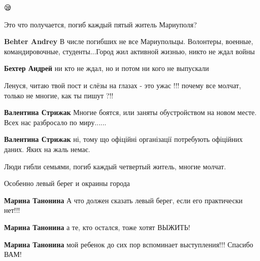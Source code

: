  
 
 
 
 

\qqSecCmt

😪


Это что получается, погиб каждый пятый житель Мариуполя?

\begin{itemize} %
\textbf{Behter Andrey} В числе погибших не все Мариупольцы. Волонтеры, военные, командировочные, студенты...Город жил активной жизнью, никто не ждал войны

\textbf{Бехтер Андрей} ни кто не ждал, но и потом ни кого не выпускали

\end{itemize} %


Ленуся, читаю твой пост и слёзы на глазах - это ужас !!! почему все молчат,
только не многие, как ты пишут ?!!

\begin{itemize} %
\textbf{Валентина Стрижак} Многие боятся, или заняты обустройством на новом месте. Всех нас разбросало по миру......

\textbf{Валентина Стрижак} ні, тому що офіційні організації потребують офіційних даних. Яких на жаль немає.
\end{itemize} %


Люди гибли семьями, погиб каждый четвертый житель, многие молчат.

Особенно левый берег и окраины города

\begin{itemize} %
\textbf{Марина Танонина} А что должен сказать левый берег, если его практически нет!!!

\textbf{Марина Танонина} а те, кто остался, тоже хотят ВЫЖИТЬ!

\textbf{Марина Танонина} мой ребенок до сих пор вспоминает выступления!!! Спасибо ВАМ!
\end{itemize} %

